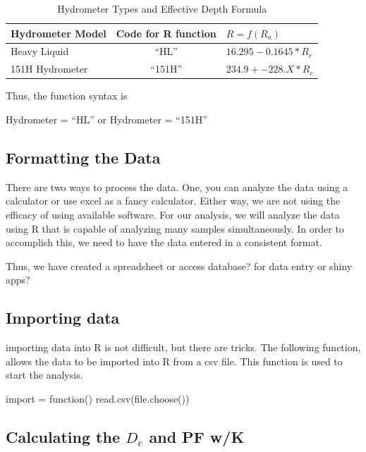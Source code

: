 \documentclass{tufte-handout}
\begin{document}
\begin{table}
		\begin{tabular}{lcl}\hline
Hydrometer Model	& Code for R function  	&	$R = f(R_a)$	\\ \hline\hline
Heavy Liquid			&		``HL''							&	$16.295 - 0.1645 * R_c$\\
151H Hydrometer		& 	``151H''						& $234.9 + -228.X * R_c$\\ \hline
		\end{tabular}
	\caption{Hydrometer Types and Effective Depth Formula}
	\label{tab:HydrometerTypesAndEffectiveDepthFormula}
\end{table}

Thus, the function syntax is

Hydrometer = ``HL'' or Hydrometer = ``151H''

\subsection{Formatting the Data}

There are two ways to process the data. One, you can analyze the data using a calculator or use excel as a fancy calculator. Either way, we are not using the efficacy of using available software. For our analysis, we will analyze the data using R that is capable of analyzing many samples simultaneously. In order to accomplish this, we need to have the data entered in a consistent format. 

Thus, we have created a spreadsheet or access database? for data entry or shiny apps?

\subsection{Importing data}

importing data into R is not difficult, but there are tricks. The following function, allows the data to be imported into R from a csv file. This function is used to start the analysis. 

\begin{Schunk}
\begin{Sinput}
 import = function(){
 read.csv(file.choose())
 }
\end{Sinput}
\end{Schunk}

\subsection{Calculating the $D_e$ and PF w/K}
\end{document}
